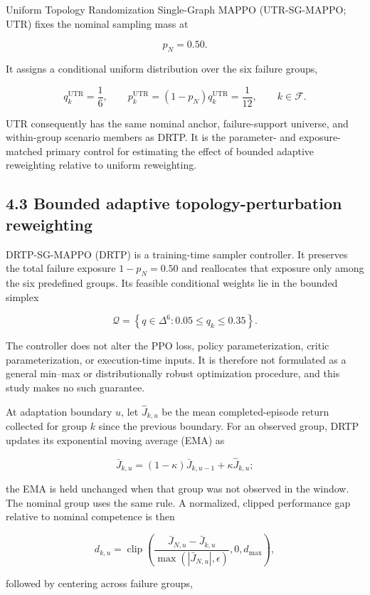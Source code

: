 Uniform Topology Randomization Single-Graph MAPPO (UTR-SG-MAPPO; UTR) fixes the nominal sampling mass at

\[
p_N=0.50.
\]

It assigns a conditional uniform distribution over the six failure groups,

\[
q_k^{\mathrm{UTR}}=\frac{1}{6},\qquad
p_k^{\mathrm{UTR}}=(1-p_N)q_k^{\mathrm{UTR}}=\frac{1}{12},
\qquad k\in\mathcal F.
\]

UTR consequently has the same nominal anchor, failure-support universe, and within-group scenario members as DRTP. It is the parameter- and exposure-matched primary control for estimating the effect of bounded adaptive reweighting relative to uniform reweighting.

\subsection{4.3 Bounded adaptive topology-perturbation reweighting}

DRTP-SG-MAPPO (DRTP) is a training-time sampler controller. It preserves the total failure exposure \(1-p_N=0.50\) and reallocates that exposure only among the six predefined groups. Its feasible conditional weights lie in the bounded simplex

\[
\mathcal Q=\left\{q\in\Delta^6:0.05\leq q_k\leq0.35\right\}.
\]

The controller does not alter the PPO loss, policy parameterization, critic parameterization, or execution-time inputs. It is therefore not formulated as a general min--max or distributionally robust optimization procedure, and this study makes no such guarantee.

At adaptation boundary \(u\), let \(\widehat J_{k,u}\) be the mean completed-episode return collected for group \(k\) since the previous boundary. For an observed group, DRTP updates its exponential moving average (EMA) as

\[
\bar J_{k,u}=(1-\kappa)\bar J_{k,u-1}+\kappa\widehat J_{k,u};
\]

the EMA is held unchanged when that group was not observed in the window. The nominal group uses the same rule. A normalized, clipped performance gap relative to nominal competence is then

\[
d_{k,u}=\operatorname{clip}\!\left(
\frac{\bar J_{N,u}-\bar J_{k,u}}
{\max(|\bar J_{N,u}|,\epsilon)},0,d_{\max}
\right),
\]

followed by centering across failure groups,

